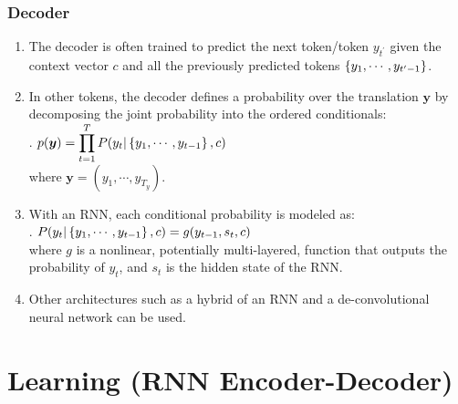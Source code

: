\subsubsection*{Decoder}

\begin{enumerate}
    \item The decoder is often trained to predict the next token/token $y_{t^\prime}$ given the context vector $c$ and all the previously predicted tokens $\left\{y_1, \cdots , y_{t^\prime-1}\right\}$.
    \hfill \cite{arxiv/1409.0473/NMT-Jointly-Learning-Align-Translate}

    \item In other tokens, the decoder defines a probability over the translation $\bm{y}$ by decomposing the joint probability into the ordered conditionals:
    \hfill \cite{arxiv/1409.0473/NMT-Jointly-Learning-Align-Translate}
    \\[0.2cm]
    .\hfill
    $
        p(\bm{y}) = \displaystyle\prod_{t=1}^T P(y_t | \left\{y_1, \cdots , y_{t-1}\right\} , c)
    $
    \hfill \cite{arxiv/1409.0473/NMT-Jointly-Learning-Align-Translate}
    \\[0.2cm]
    where $\bm{y} = (y_1, \cdots , y_{T_y})$.
    \hfill \cite{arxiv/1409.0473/NMT-Jointly-Learning-Align-Translate}

    \item With an RNN, each conditional probability is modeled as:
    \hfill \cite{arxiv/1409.0473/NMT-Jointly-Learning-Align-Translate}
    \\[0.2cm]
    .\hfill
    $ P(y_t | \left\{y_1, \cdots , y_{t-1}\right\} , c) = g(y_{t-1}, s_t, c) $
    \hfill \cite{arxiv/1409.0473/NMT-Jointly-Learning-Align-Translate}
    \\[0.2cm]
    where $g$ is a nonlinear, potentially multi-layered, function that outputs the probability of $y_t$, and $s_t$ is the hidden state of the RNN.
    \hfill \cite{arxiv/1409.0473/NMT-Jointly-Learning-Align-Translate}

    \item Other architectures such as a hybrid of an RNN and a de-convolutional neural network can be used.
    \hfill \cite{arxiv/1409.0473/NMT-Jointly-Learning-Align-Translate}
\end{enumerate}









\section{Learning (RNN Encoder-Decoder)}

